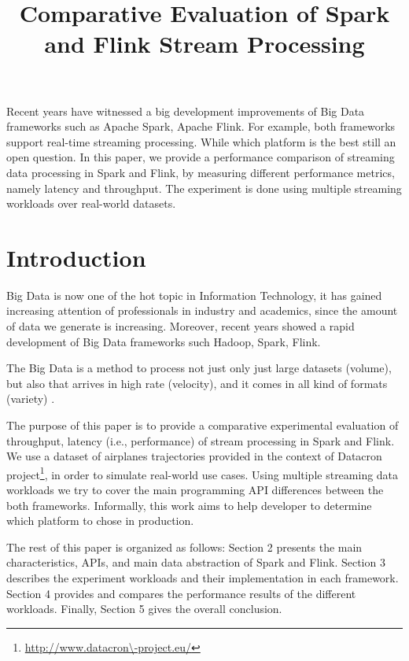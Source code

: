 \documentclass[]{article}
\title{Comparative Evaluation of Spark and Flink Stream Processing}
\begin{document}
\maketitle
\newpage
\tableofcontents

\newpage


\begin{abstract}

\end{abstract}
Recent years have witnessed a big development improvements of Big Data frameworks such as Apache Spark, Apache Flink. For example, both frameworks support real-time
streaming processing. While which platform is the best still an open question. 
In this paper, we provide a performance comparison of streaming data processing in Spark and Flink, by measuring different performance metrics, namely latency and throughput. The experiment is done using multiple streaming workloads over real-world datasets.
\section{Introduction}

\par Big Data is now one of the hot topic in Information Technology, it has gained increasing attention of professionals in industry and academics, since the amount of data we generate is increasing. Moreover, recent years showed a rapid development of Big Data frameworks such Hadoop, Spark, Flink.    
 \par The Big Data is a method to process not just only just large datasets (volume), but also that arrives in high rate (velocity), and it comes in all kind of formats (variety) \cite{svs}.


\par The purpose of this paper is to provide a comparative experimental evaluation of throughput, latency (i.e., performance) of stream processing in Spark and Flink. We use a dataset of airplanes trajectories provided in the context of Datacron project\footnote{\url{http://www.datacron\-project.eu/}}, in order to simulate real-world use cases. Using multiple streaming data workloads we try to cover the main programming API differences between the both frameworks. Informally,  this work aims to help developer to determine which platform to chose in production. 

\par The rest of this paper is organized as follows: Section 2
presents the main characteristics, APIs, and main data abstraction of Spark and Flink. Section 3  describes the experiment workloads and their implementation in each framework. Section 4
provides and compares the performance results of the different workloads. Finally, Section 5 gives the overall conclusion.
\end{document}
